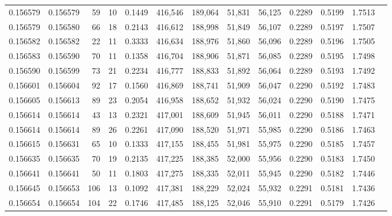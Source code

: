 \begin{tabular}{rrrrrrrrrrrrr}
0.156579 & 0.156579 &    59 &  10 &                                     0.1449 & 416,546 & 189,064 &  51,831 &  56,125 & 0.2289 & 0.5199 & 1.7513 \\
0.156579 & 0.156580 &    66 &  18 &                                     0.2143 & 416,612 & 188,998 &  51,849 &  56,107 & 0.2289 & 0.5197 & 1.7507 \\
0.156582 & 0.156582 &    22 &  11 &                                     0.3333 & 416,634 & 188,976 &  51,860 &  56,096 & 0.2289 & 0.5196 & 1.7505 \\
0.156583 & 0.156590 &    70 &  11 &                                     0.1358 & 416,704 & 188,906 &  51,871 &  56,085 & 0.2289 & 0.5195 & 1.7498 \\
0.156590 & 0.156599 &    73 &  21 &                                     0.2234 & 416,777 & 188,833 &  51,892 &  56,064 & 0.2289 & 0.5193 & 1.7492 \\
0.156601 & 0.156604 &    92 &  17 &                                     0.1560 & 416,869 & 188,741 &  51,909 &  56,047 & 0.2290 & 0.5192 & 1.7483 \\
0.156605 & 0.156613 &    89 &  23 &                                     0.2054 & 416,958 & 188,652 &  51,932 &  56,024 & 0.2290 & 0.5190 & 1.7475 \\
0.156614 & 0.156614 &    43 &  13 &                                     0.2321 & 417,001 & 188,609 &  51,945 &  56,011 & 0.2290 & 0.5188 & 1.7471 \\
0.156614 & 0.156614 &    89 &  26 &                                     0.2261 & 417,090 & 188,520 &  51,971 &  55,985 & 0.2290 & 0.5186 & 1.7463 \\
0.156615 & 0.156631 &    65 &  10 &                                     0.1333 & 417,155 & 188,455 &  51,981 &  55,975 & 0.2290 & 0.5185 & 1.7457 \\
0.156635 & 0.156635 &    70 &  19 &                                     0.2135 & 417,225 & 188,385 &  52,000 &  55,956 & 0.2290 & 0.5183 & 1.7450 \\
0.156641 & 0.156641 &    50 &  11 &                                     0.1803 & 417,275 & 188,335 &  52,011 &  55,945 & 0.2290 & 0.5182 & 1.7446 \\
0.156645 & 0.156653 &   106 &  13 &                                     0.1092 & 417,381 & 188,229 &  52,024 &  55,932 & 0.2291 & 0.5181 & 1.7436 \\
0.156654 & 0.156654 &   104 &  22 &                                     0.1746 & 417,485 & 188,125 &  52,046 &  55,910 & 0.2291 & 0.5179 & 1.7426 \\

\end{tabular}
